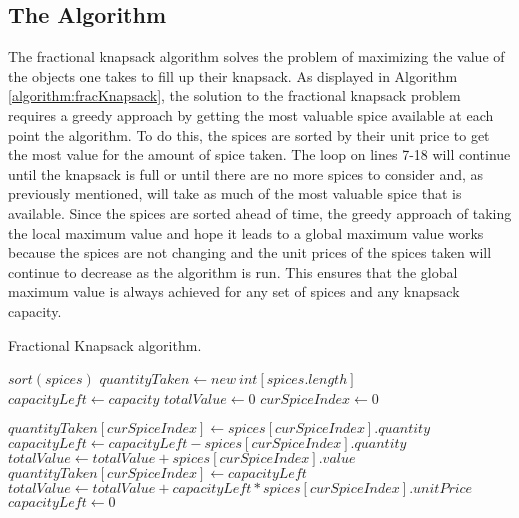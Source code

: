 \documentclass[letterpaper, 10pt,DIV=13]{scrartcl}
\numberwithin{equation}{section} %
\numberwithin{figure}{section} %
\numberwithin{table}{section} %
\begin{document}
\subsection{The Algorithm}
The fractional knapsack algorithm solves the problem of maximizing the value of the objects one takes to fill up their knapsack. As displayed in Algorithm \ref{algorithm:fracKnapsack}, the solution to the fractional knapsack problem requires a greedy approach by getting the most valuable spice available at each point the algorithm. To do this, the spices are sorted by their unit price to get the most value for the amount of spice taken. The loop on lines 7-18 will continue until the knapsack is full or until there are no more spices to consider and, as previously mentioned, will take as much of the most valuable spice that is available. Since the spices are sorted ahead of time, the greedy approach of taking the local maximum value and hope it leads to a global maximum value works because the spices are not changing and the unit prices of the spices taken will continue to decrease as the algorithm is run. This ensures that the global maximum value is always achieved for any set of spices and any knapsack capacity.

\begin{algorithm}
  \caption{Fractional Knapsack algorithm.}
  \label{algorithm:fracKnapsack}
  \begin{algorithmic}[1]
      \State $sort(spices)$ 
      \State $quantityTaken \gets new~int[spices.length]$ 
      \State $capacityLeft \gets capacity$ 
      \State $totalValue \gets 0$ 
      \State $curSpiceIndex \gets 0$ 

         
          \State $quantityTaken[curSpiceIndex] \gets spices[curSpiceIndex].quantity$
          \State $capacityLeft \gets capacityLeft - spices[curSpiceIndex].quantity$
          \State $totalValue \gets totalValue + spices[curSpiceIndex].value$ 
        \Else {}
          \State $quantityTaken[curSpiceIndex] \gets capacityLeft$
          \State $totalValue \gets totalValue + capacityLeft * spices[curSpiceIndex].unitPrice$
          \State $capacityLeft \gets 0$
        \EndIf

         
      \EndWhile
      \State {}
    \EndProcedure
  \end{algorithmic}
\end{algorithm}
\end{document}
